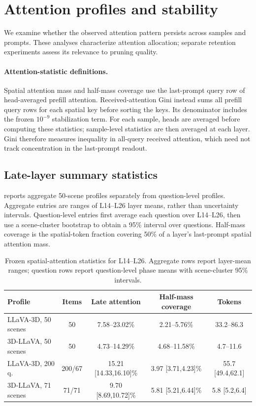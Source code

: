 \section{Attention profiles and stability}
\label{sec:supp_profiles}

We examine whether the observed attention pattern persists across samples and prompts. These analyses characterize attention allocation; separate retention experiments assess its relevance to pruning quality.

\paragraph{Attention-statistic definitions.} Spatial attention mass and half-mass coverage use the last-prompt query row of head-averaged prefill attention. Received-attention Gini instead sums all prefill query rows for each spatial key before sorting the keys. Its denominator includes the frozen $10^{-9}$ stabilization term. For each sample, heads are averaged before computing these statistics; sample-level statistics are then averaged at each layer. Gini therefore measures inequality in all-query received attention, which need not track concentration in the last-prompt readout.



\subsection{Late-layer summary statistics}
 reports aggregate 50-scene profiles separately from question-level profiles. Aggregate entries are ranges of L14--L26 layer means, rather than uncertainty intervals. Question-level entries first average each question over L14--L26, then use a scene-cluster bootstrap to obtain a 95\% interval over questions. Half-mass coverage is the spatial-token fraction covering 50\% of a layer's last-prompt spatial attention mass.

\begin{table}[t]
\centering
\small
\caption{Frozen spatial-attention statistics for L14--L26. Aggregate rows report layer-mean ranges; question rows report question-level phase means with scene-cluster 95\% intervals.}
\label{tab:supp_profile_statistics}
\begin{tabular}{lcccc}
\toprule
Profile & Items & Late attention & Half-mass coverage & Tokens \\
\midrule
LLaVA-3D, 50 scenes & 50 & 7.58--23.02\% & 2.21--5.76\% & 33.2--86.3 \\
3D-LLaVA, 50 scenes & 50 & 4.73--14.29\% & 4.68--11.58\% & 4.7--11.6 \\
LLaVA-3D, 200 q. & 200/67 & 15.21 [14.33,16.10]\% &
3.97 [3.71,4.23]\% & 55.7 [49.4,62.1] \\
3D-LLaVA, 71 scenes & 71/71 & 9.70 [8.69,10.72]\% &
5.81 [5.21,6.44]\% & 5.8 [5.2,6.4] \\
\bottomrule
\end{tabular}
\end{table}


